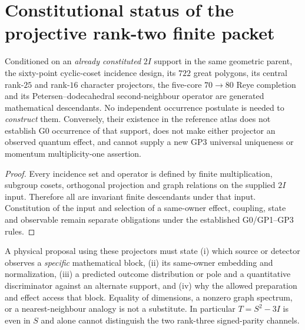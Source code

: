 \documentclass[12pt,a4paper]{article}
\begin{document}
\section{Constitutional status of the projective rank-two finite packet}
\label{p2a:sec:v340-ranktwo-selection}
\begin{proposition}
\label{p2a:prop:v340-ranktwo-nonactualization}
Conditioned on an \emph{already constituted} $2I$ support in the
same geometric parent, the sixty-point cyclic-coset incidence design,
its $722$ great polygons, its central rank-$25$ and rank-$16$
character projectors, the five-core $70\to80$ Reye completion and
its Petersen--dodecahedral second-neighbour operator are generated
mathematical descendants. No independent occurrence postulate is
needed to \emph{construct} them. Conversely, their existence in the
reference atlas does not establish G0 occurrence of that support,
does not make either projector an observed quantum effect, and
cannot supply a new GP3 universal uniqueness or momentum
multiplicity-one assertion.
\end{proposition}
\begin{proof}
Every incidence set and operator is defined by finite
multiplication, subgroup cosets, orthogonal projection and graph
relations on the supplied $2I$ input. Therefore all are invariant
finite descendants under that input. Constitution of the input and
selection of a same-owner effect, coupling, state and observable
remain separate obligations under the established G0/GP1--GP3 rules.
\end{proof}
\begin{remark}
\label{p2a:rem:v340-ranktwo-observable-first}
A physical proposal using these projectors must state (i) which
source or detector observes a \emph{specific} mathematical block,
(ii) its same-owner embedding and normalization, (iii) a predicted
outcome distribution or pole and a quantitative discriminator against
an alternate support, and (iv) why the allowed preparation and effect
access that block. Equality of dimensions, a nonzero graph spectrum,
or a nearest-neighbour analogy is not a substitute. In particular
$T=S^2-3I$ is even in $S$ and alone cannot distinguish the two
rank-three signed-parity channels.
\end{remark}
\end{document}
